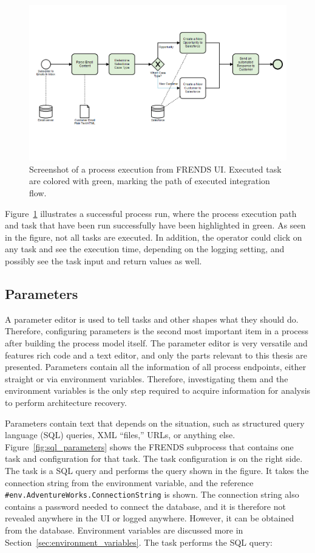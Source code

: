 \documentclass[english, 12pt, a4paper, sci, utf8, a-2b, online, obeyspaces]{aaltothesis}
\begin{document}
\begin{figure}[htb]
  \centering
      \includegraphics[width=\textwidth]{pictures/frends/Process_run.png}
  \caption{Screenshot of a process execution from FRENDS UI. Executed task are colored with green, marking the path of executed integration flow.}
  \label{fig:Process_run}
\end{figure}

Figure~\ref{fig:Process_run} illustrates a successful process run, where the process execution path and task that have been run successfully have been highlighted in green. As seen in the figure, not all tasks are executed. In addition, the operator could click on any task and see the execution time, depending on the logging setting, and possibly see the task input and return values as well.

\subsection{Parameters}
\label{sec:parameters}
A parameter editor is used to tell tasks and other shapes what they should do. Therefore, configuring parameters is the second most important item in a process after building the process model itself. The parameter editor is very versatile and features rich code and a text editor, and only the parts relevant to this thesis are presented. Parameters contain all the information of all process endpoints, either straight or via environment variables. Therefore, investigating them and the environment variables is the only step required to acquire information for analysis to perform architecture recovery.

Parameters contain text that depends on the situation, such as structured query language (SQL) queries, XML “files,” URLs, or anything else. Figure~\ref{fig:sql_parameters} shows the FRENDS subprocess that contains one task and configuration for that task. The task configuration is on the right side. The task is a SQL query and performs the query shown in the figure. It takes the connection string from the environment variable, and the reference \verb|#env.AdventureWorks.ConnectionString| is shown.  The connection string also contains a password needed to connect the database, and it is therefore not revealed anywhere in the UI or logged anywhere. However, it can be obtained from the database. Environment variables are discussed more in Section~\ref{sec:environment_variables}. The task performs the SQL query:
\end{document}
